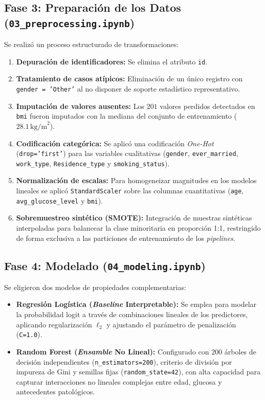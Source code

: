 \documentclass[12pt,a4paper]{article}
\begin{document}
\subsection{Fase 3: Preparación de los Datos (\texttt{03\_preprocessing.ipynb})}
Se realizó un proceso estructurado de transformaciones:
\begin{enumerate}[leftmargin=1.2cm, itemsep=0.2em]
    \item \textbf{Depuración de identificadores:} Se elimina el atributo \texttt{id}.
    \item \textbf{Tratamiento de casos atípicos:} Eliminación de un único registro con \texttt{gender = 'Other'} al no disponer de soporte estadístico representativo.
    \item \textbf{Imputación de valores ausentes:} Los $201$ valores perdidos detectados en \texttt{bmi} fueron imputados con la mediana del conjunto de entrenamiento ($28.1\,\text{kg/m}^2$).
    \item \textbf{Codificación categórica:} Se aplicó una codificación \textit{One-Hot} (\texttt{drop='first'}) para las variables cualitativas (\texttt{gender}, \texttt{ever\_married}, \texttt{work\_type}, \texttt{Residence\_type} y \texttt{smoking\_status}).
    \item \textbf{Normalización de escalas:} Para homogeneizar magnitudes en los modelos lineales se aplicó \texttt{StandardScaler} sobre las columnas cuantitativas (\texttt{age}, \texttt{avg\_glucose\_level} y \texttt{bmi}).
    \item \textbf{Sobremuestreo sintético (SMOTE):} Integración de muestras sintéticas interpoladas para balancear la clase minoritaria en proporción 1:1, restringido de forma exclusiva a las particiones de entrenamiento de los \textit{pipelines}.
\end{enumerate}

\subsection{Fase 4: Modelado (\texttt{04\_modeling.ipynb})}
Se eligieron dos modelos de propiedades complementarias:
\begin{itemize}[leftmargin=1.2cm, itemsep=0.3em]
    \item \textbf{Regresión Logística (\textit{Baseline} Interpretable):} Se emplea para modelar la probabilidad logit a través de combinaciones lineales de los predictores, aplicando regularización $\ell_2$ y ajustando el parámetro de penalización (\texttt{C=1.0}).
    \item \textbf{Random Forest (\textit{Ensamble} No Lineal):} Configurado con $200$ árboles de decisión independientes (\texttt{n\_estimators=200}), criterio de división por impureza de Gini y semillas fijas (\texttt{random\_state=42}), con alta capacidad para capturar interacciones no lineales complejas entre edad, glucosa y antecedentes patológicos.
\end{itemize}
\end{document}
